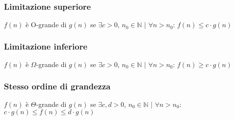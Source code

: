 \subsubsection{Limitazione superiore}
\begin{center}
    $f(n)$ è O-grande di $g(n)$ se $\exists c > 0$, $n_0 \in \mathbb{N}$ $|$ $\forall n > n_0$: $f(n) \le c \cdot g(n)$   
\end{center}

\subsubsection{Limitazione inferiore}
\begin{center}
    $f(n)$ è $\Omega$-grande di $g(n)$ se $\exists c > 0$, $n_0 \in \mathbb{N}$ $|$ $\forall n > n_0$: $f(n) \ge c \cdot g(n)$ 
\end{center}

\subsubsection{Stesso ordine di grandezza}
\begin{center}
    $f(n)$ è $\Theta$-grande di $g(n)$ se $\exists c, d > 0$, $n_0 \in \mathbb{N}$ $|$ $\forall n > n_0$: $c \cdot g(n) \le f(n) \le d \cdot g(n)$ 
\end{center}

\clearpage
